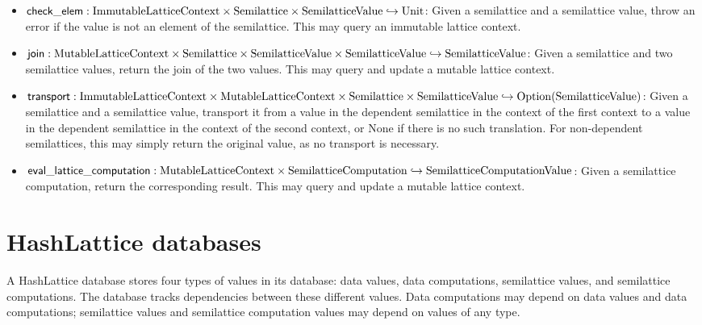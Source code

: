 \documentclass{article}
\begin{document}
      \begin{itemize}
        \item $\mathsf{check\_elem} : \mathrm{ImmutableLatticeContext} \times \mathrm{Semilattice} \times \mathrm{SemilatticeValue} \hookrightarrow \mathrm{Unit}$: Given a semilattice and a semilattice value, throw an error if the value is not an element of the semilattice. This may query an immutable lattice context.
        \item $\mathsf{join} : \mathrm{MutableLatticeContext} \times \mathrm{Semilattice} \times \mathrm{SemilatticeValue} \times \mathrm{SemilatticeValue} \hookrightarrow \mathrm{SemilatticeValue}$: Given a semilattice and two semilattice values, return the join of the two values. This may query and update a mutable lattice context.
        \item $\mathsf{transport} : \mathrm{ImmutableLatticeContext} \times \mathrm{MutableLatticeContext} \times \mathrm{Semilattice} \times \mathrm{SemilatticeValue} \hookrightarrow \mathrm{Option}(\mathrm{SemilatticeValue})$: Given a semilattice and a semilattice value, transport it from a value in the dependent semilattice in the context of the first context to a value in the dependent semilattice in the context of the second context, or $\mathrm{None}$ if there is no such translation. For non-dependent semilattices, this may simply return the original value, as no transport is necessary.
        \item $\mathsf{eval\_lattice\_computation} : \mathrm{MutableLatticeContext} \times \mathrm{SemilatticeComputation} \hookrightarrow \mathrm{SemilatticeComputationValue}$: Given a semilattice computation, return the corresponding result. This may query and update a mutable lattice context.
      \end{itemize}
  
  \section{HashLattice databases}

    A HashLattice database stores four types of values in its database: data values, data computations, semilattice values, and semilattice computations. The database tracks dependencies between these different values. Data computations may depend on data values and data computations; semilattice values and semilattice computation values may depend on values of any type.
\end{document}
